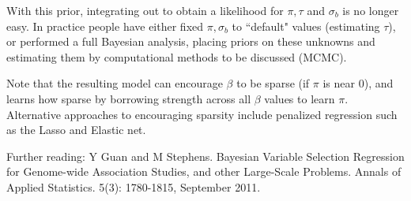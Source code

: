\documentclass{article}
\begin{document}
With this prior, integrating out to obtain  a likelihood for $\pi,\tau$ and $\sigma_b$ is no longer easy. In practice people have either fixed $\pi, \sigma_b$  to ``default" values (estimating $\tau$), or performed a full Bayesian analysis, placing priors on these unknowns and estimating them by computational methods to be discussed (MCMC).

Note that the resulting model can encourage $\beta$ to be sparse (if $\pi$ is near 0),
and learns how sparse by borrowing strength across all $\beta$ values to
learn $\pi$. Alternative approaches to encouraging sparsity include penalized regression such as the Lasso and Elastic net. 

Further reading: Y Guan and M Stephens. Bayesian Variable Selection Regression for Genome-wide Association Studies, and other Large-Scale Problems. Annals of Applied Statistics. 5(3): 1780-1815, September 2011.
\end{document}
